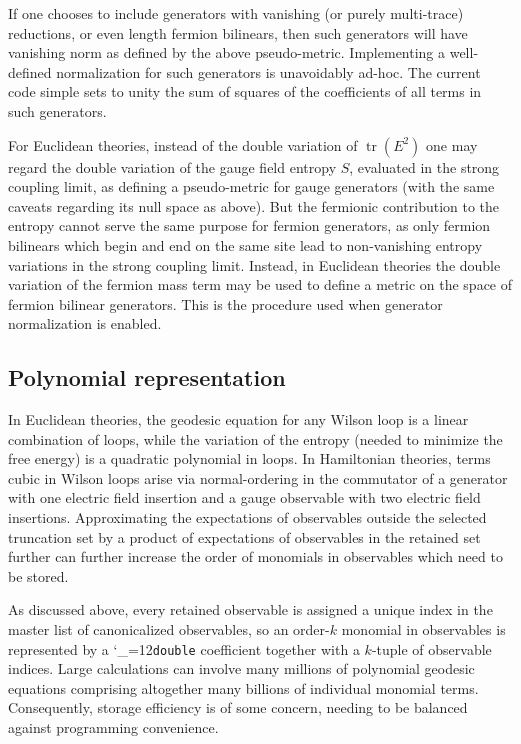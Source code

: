 \documentclass [12pt]{article}
\makeatletter
\renewcommand{\tt}{\begingroup\catcode`_=12\def\_{\string_}\tt@}
\newcommand{\tt@}[1]{\texttt{#1}\endgroup}
\newcommand{\tr}{\mathop{\mathrm{tr}}}
\makeatother
\begin{document}
If one chooses to include generators with vanishing
(or purely multi-trace) reductions, or even length fermion bilinears,
then such generators will have
vanishing norm as defined by the above pseudo-metric.
Implementing a well-defined normalization for such generators
is unavoidably ad-hoc.
The current code simple sets to unity the sum of squares of
the coefficients of all terms in such generators.

For Euclidean theories, instead of the double variation of $\tr(E^2)$
one may regard the double variation of the gauge field entropy $S$,
evaluated in the strong coupling limit, as defining a pseudo-metric
for gauge generators (with the same caveats regarding its null space
as above).
But the fermionic contribution to the entropy cannot serve the same
purpose for fermion generators, as only 
fermion bilinears which
begin and end on the same site lead to non-vanishing entropy
variations in the strong coupling limit.
Instead, in Euclidean theories the double variation of the fermion mass term
may be used to define a metric on the space of fermion bilinear generators.
This is the procedure used when generator normalization is enabled.

\subsection {Polynomial representation}

In Euclidean theories, the geodesic equation for any
Wilson loop is a linear combination of loops,
while the variation of the entropy (needed to minimize
the free energy) is a quadratic polynomial in loops.
In Hamiltonian theories, terms cubic in Wilson loops
arise via normal-ordering in the commutator of a
generator with one electric field insertion and
a gauge observable with two electric field insertions.
Approximating the expectations of observables outside
the selected truncation set by a product of expectations
of observables in the retained set further can further
increase the order of monomials in observables which
need to be stored.

As discussed above, every retained observable is
assigned a unique index in the master list of
canonicalized observables, so an order-$k$ monomial in
observables is represented by a \tt{double} coefficient
together with a $k$-tuple of observable indices.
Large calculations can involve many millions of polynomial geodesic
equations comprising altogether many billions of individual monomial terms.
Consequently, storage efficiency is of some concern,
needing to be balanced against programming convenience.
\end{document}
